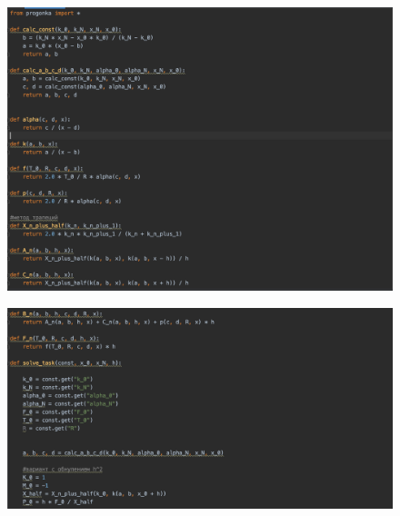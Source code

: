 \documentclass[a4paper,12pt]{article}
\begin{document}
	\begin{figure}[h!]
		\begin{center}
			{\includegraphics[scale = 0.6]{task1.png}}
		\end{center}
		\label{task1}
	\end{figure}
	
	\begin{figure}[h!]
		\begin{center}
			{\includegraphics[scale = 0.6]{task2.png}}
		\end{center}
		\label{task2}
	\end{figure}
\end{document}
